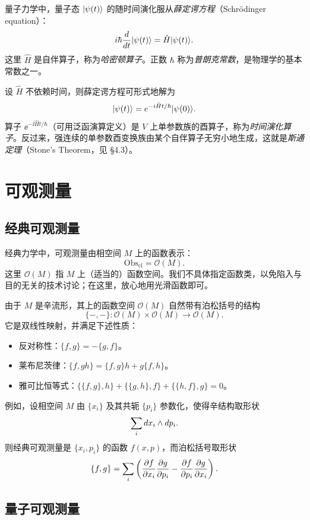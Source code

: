 量子力学中，量子态 $|\psi(t)\rangle$ 的随时间演化服从\emph{薛定谔方程}（Schrödinger equation）：
\[
i\hbar\frac{d}{d t}|\psi(t)\rangle=\hat H|\psi(t)\rangle.
\]
这里 $\hat H$ 是自伴算子，称为\emph{哈密顿算子}。正数 $\hbar$ 称为\emph{普朗克常数}，是物理学的基本常数之一。

设 $\hat H$ 不依赖时间，则薛定谔方程可形式地解为
\[
|\psi(t)\rangle=e^{-i\hat H t/\hbar}|\psi(0)\rangle.
\]
算子 $\ee^{-\ii\hat H t/\hbar}$（可用泛函演算定义）是 $V$ 上单参数族的酉算子，称为\emph{时间演化算子}。反过来，强连续的单参数酉变换族由某个自伴算子无穷小地生成，这就是\emph{斯通定理}（Stone's Theorem，见 §4.3）。

\section{可观测量}

\subsection{经典可观测量}

经典力学中，可观测量由相空间 $M$ 上的函数表示：
\[
\mathrm{Obs}_{\mathrm{cl}}=\mathcal{O}(M).
\]
这里 $\mathcal{O}(M)$ 指 $M$ 上（适当的）函数空间。我们不具体指定函数类，以免陷入与目的无关的技术讨论；在这里，放心地用光滑函数即可。

由于 $M$ 是辛流形，其上的函数空间 $\mathcal{O}(M)$ 自然带有泊松括号的结构
\[
\{-,-\}:\mathcal{O}(M)\times\mathcal{O}(M)\longrightarrow\mathcal{O}(M).
\]
它是双线性映射，并满足下述性质：
\begin{itemize}[leftmargin=2em,itemsep=1pt]
  \item 反对称性：$\{f,g\}=-\{g,f\}$。
  \item 莱布尼茨律：$\{f,gh\}=\{f,g\}h+g\{f,h\}$。
  \item 雅可比恒等式：$\{\{f,g\},h\}+\{\{g,h\},f\}+\{\{h,f\},g\}=0$。
\end{itemize}

例如，设相空间 $M$ 由 $\{x_i\}$ 及其共轭 $\{p_i\}$ 参数化，使得辛结构取形状
\[
\sum_i d x_i\wedge d p_i.
\]
则经典可观测量是 $\{x_i,p_i\}$ 的函数 $f(x,p)$，而泊松括号取形状
\[
\{f,g\}=\sum_i\left(\frac{\partial f}{\partial x_i}\frac{\partial g}{\partial p_i}-\frac{\partial f}{\partial p_i}\frac{\partial g}{\partial x_i}\right).
\]

\subsection{量子可观测量}

